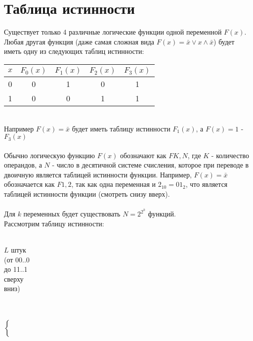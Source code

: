\section{Таблица истинности}
Существует только 4 различные логические функции одной переменной $F(x)$. Любая другая функция (даже самая сложная вида $F(x) = \bar{x} \vee x \wedge \bar{x}$) будет иметь одну из следующих таблиц истинности:
\begin{table}[!h]
\begin{tabular}{|c||c|c|c|c|}
\hline
$x$ & $F_0(x)$ & $F_1(x)$ & $F_2(x)$ & $F_3(x)$ \\
\hline
\hline
0 & 0 & 1 & 0 & 1 \\
\hline
1 & 0 & 0 & 1 & 1 \\
\hline
\end{tabular}
\end{table}
\\Например $F(x) = \bar{x}$ будет иметь таблицу истинности $F_1(x)$, а $F(x) = 1$ - $F_3(x)$
\\
\\Обычно логическую функцию $F(x)$ обозначают как $FK,N$, где $K$ - количество операндов, а $N$ - число в десятичной системе счисления, которое при переводе в двоичную является таблицей истинности функции. Например, $F(x) = \bar{x}$ обозначается как $F1,2$, так как одна переменная и $2_{10} = 01_{2}$, что является таблицей истинности функции (смотреть снизу вверх).
\\
\\Для $k$ переменных будет существовать $N = 2^{2^{k}}$ функций.
\\Рассмотрим таблицу истинности:
\\
\\
\begin{minipage}{2cm}
\begin{center}
$L$ штук\\
(от 00..0\\ до 11..1 \\ сверху \\ вниз)
\end{center}
\end{minipage}
\begin{minipage}{0.3cm}
\quad \\
\quad \\
$\left\{
\begin{array}{c}
\\
\\
\\
\\
\end{array}
\right.$
\quad \\
\end{minipage}
